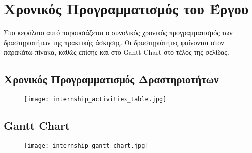 \chapter*{Χρονικός Προγραμματισμός του Έργου}

Στο κεφάλαιο αυτό παρουσιάζεται ο συνολικός χρονικός προγραμματισμός των δραστηριοτήτων της πρακτικής άσκησης. Οι δραστηριότητες φαίνονται στον παρακάτω πίνακα, καθώς επίσης 
και στο Gantt Chart στο τέλος της σελίδας.\\

\section{Χρονικός Προγραμματισμός Δραστηριοτήτων}
\begin{figure}[h]
    \texttt{[image: internship\_activities\_table.jpg]}
    \centering
\end{figure}

\section{Gantt Chart}
\begin{figure}[h]
    \texttt{[image: internship\_gantt\_chart.jpg]}
    \centering
\end{figure}
